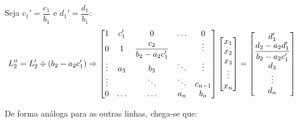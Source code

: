 Seja $c_1' = \dfrac{c_1}{b_1}$ e $d_1' = \dfrac{d_1}{b_1}$:
\begin{equation*}
	L_2'' = L_2'\divisionsymbol (b_2-a_2c_1')  \Rightarrow
	\begin{bmatrix}
		1 & c_1' &    0     &   \ldots     & 0\\
		0 & 1 &   \dfrac{c_2}{b_2-a_2c_1'}   &        & \vdots \\
	\vdots & a_3 &   b_3   & \ddots & \vdots \\
	\vdots &     &  \ddots & \ddots & c_{n-1} \\
	     0  &  \ldots   &  \ldots    &  a_n   & b_n 
	\end{bmatrix}
	\begin{bmatrix}
		x_1 \\
		x_2 \\
		x_3 \\
		\vdots \\
		x_n
	\end{bmatrix}
	=\begin{bmatrix}
		d_1' \\
		\dfrac{d_2 - a_2d_1'}{b_2-a_2c_1'}\\
		d_3 \\
		\vdots \\
		d_n
	\end{bmatrix}
\end{equation*}

De forma análoga para as outras linhas, chega-se que:

